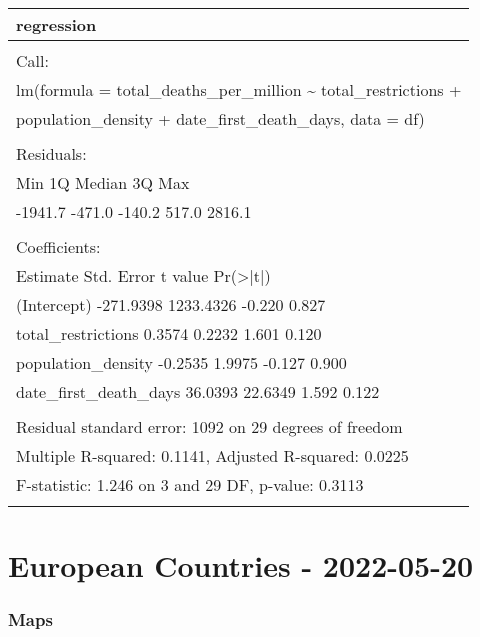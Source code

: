 \documentclass[
]{article}
\begin{document}
\begin{table}
\centering
\begin{tabular}[t]{l}
\hline
regression\\
\hline
\\
\hline
Call:\\
\hline
lm(formula = total\_deaths\_per\_million \textasciitilde{} total\_restrictions +\\
\hline
population\_density + date\_first\_death\_days, data = df)\\
\hline
\\
\hline
Residuals:\\
\hline
Min      1Q  Median      3Q     Max\\
\hline
-1941.7  -471.0  -140.2   517.0  2816.1\\
\hline
\\
\hline
Coefficients:\\
\hline
Estimate Std. Error t value Pr(>|t|)\\
\hline
(Intercept)           -271.9398  1233.4326  -0.220    0.827\\
\hline
total\_restrictions       0.3574     0.2232   1.601    0.120\\
\hline
population\_density      -0.2535     1.9975  -0.127    0.900\\
\hline
date\_first\_death\_days   36.0393    22.6349   1.592    0.122\\
\hline
\\
\hline
Residual standard error: 1092 on 29 degrees of freedom\\
\hline
Multiple R-squared:  0.1141,    Adjusted R-squared:  0.0225\\
\hline
F-statistic: 1.246 on 3 and 29 DF,  p-value: 0.3113\\
\hline
\\
\hline
\end{tabular}
\end{table}

\hypertarget{european-countries---2022-05-20}{%
\section{\texorpdfstring{\textbf{European Countries -
2022-05-20}}{European Countries - 2022-05-20}}\label{european-countries---2022-05-20}}

\hypertarget{maps-2}{%
\subsubsection{Maps}\label{maps-2}}
\end{document}
